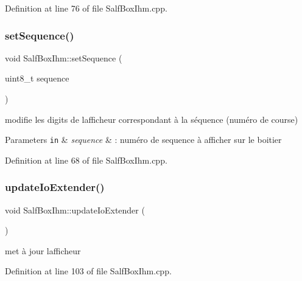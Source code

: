 Definition at line 76 of file Salf\+Box\+Ihm.\+cpp.

\mbox{\label{class_salf_box_ihm_a5952f1c4c02a795f38b5630ac7a60c55}} 
\subsubsection{\texorpdfstring{set\+Sequence()}{setSequence()}}
{\footnotesize\ttfamily void Salf\+Box\+Ihm\+::set\+Sequence (\begin{DoxyParamCaption}\item[{uint8\+\_\+t}]{sequence }\end{DoxyParamCaption})\hspace{0.3cm}{\ttfamily [static]}}



modifie les digits de l\textquotesingle{}afficheur correspondant à la séquence (numéro de course) 


\begin{DoxyParams}[1]{Parameters}
\mbox{\tt in}  & {\em sequence} & \+: numéro de sequence à afficher sur le boitier \\
\hline
\end{DoxyParams}


Definition at line 68 of file Salf\+Box\+Ihm.\+cpp.

\mbox{\label{class_salf_box_ihm_a07966fefea031c574b51c72862dfca61}} 
\subsubsection{\texorpdfstring{update\+Io\+Extender()}{updateIoExtender()}}
{\footnotesize\ttfamily void Salf\+Box\+Ihm\+::update\+Io\+Extender (\begin{DoxyParamCaption}{ }\end{DoxyParamCaption})\hspace{0.3cm}{\ttfamily [static]}}



met à jour l\textquotesingle{}afficheur 



Definition at line 103 of file Salf\+Box\+Ihm.\+cpp.



